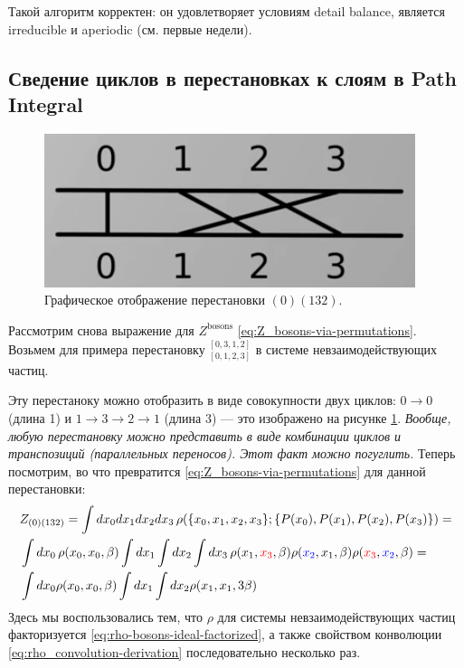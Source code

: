\begin{lecture}
    Такой алгоритм корректен: он удовлетворяет условиям detail balance, является irreducible и aperiodic (см. первые недели).

    \subsection{Сведение циклов в перестановках к слоям в Path Integral}

    \begin{figure}
        \includegraphics[width=\linewidth]{fig/permutation-cycle}
        \caption{Графическое отображение перестановки $(0)(132)$.}
        \label{fig:permutation-cycle}
    \end{figure}
    Рассмотрим снова выражение для $Z^{\text{bosons}}$ \eqref{eq:Z_bosons-via-permutations}.
    Возьмем для примера перестановку ${}^{[0, 3, 1, 2]}_{[0, 1, 2, 3]}$ в системе невзаимодействующих частиц.

    Эту перестаноку можно отобразить в виде совокупности двух циклов: $0 \rightarrow 0$ (длина 1) и $1 \rightarrow 3 \rightarrow 2 \rightarrow 1$ (длина 3) --- это изображено на рисунке \ref{fig:permutation-cycle}.
    \textit{Вообще, любую перестановку можно представить в виде комбинации циклов и транспозиций (параллельных переносов). Этот факт можно погуглить.}
    Теперь посмотрим, во что превратится \eqref{eq:Z_bosons-via-permutations} для данной перестановки:
    \begin{align}
        \label{eq:Z_0_132-full}
        & Z_{(0)(132)} = \int dx_0 dx_1 dx_2 dx_3\, \rho(\{x_0, x_1, x_2, x_3\}; \{P(x_0), P(x_1), P(x_2), P(x_3)\}) = \\
        & \int dx_0\, \rho(x_0, x_0, \beta) \int dx_1 \int dx_2 \int dx_3\, \rho(x_1, {\color{red} x_3}, \beta) \rho({\color{blue} x_2}, x_1, \beta) \rho({\color{red} x_3}, {\color{blue} x_2}, \beta) = \\
        & \int dx_0 \rho(x_0, x_0, \beta) \int dx_1 \int dx_2 \rho(x_1, x_1, 3\beta)
    \end{align}
Здесь мы воспользовались тем, что $\rho$ для системы невзаимодействующих частиц факторизуется \eqref{eq:rho-bosons-ideal-factorized}, а также свойством конволюции \eqref{eq:rho_convolution-derivation} последовательно несколько раз.


\end{lecture}
